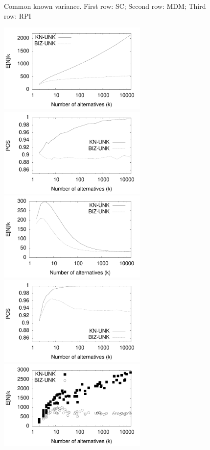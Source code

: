 \documentclass[12pt]{article}
\begin{document}
\begin{figure}[tb]
    \caption{Common known variance.  
    First row: SC;
    Second row: MDM;
    Third row: RPI}

  \end{figure}

  \begin{figure}[tb]
    \center
    \includegraphics[width=2.9in]{pdf/FINAL-UNK-SC-Nk} 
    \includegraphics[width=2.9in]{pdf/FINAL-UNK-SC-PCS}
    \includegraphics[width=2.9in]{pdf/FINAL-UNK-MDM-Nk} 
    \includegraphics[width=2.9in]{pdf/FINAL-UNK-MDM-PCS}
    \includegraphics[width=2.9in]{pdf/FINAL-UNK-RPI-Nk} 

\end{figure}
\end{document}
